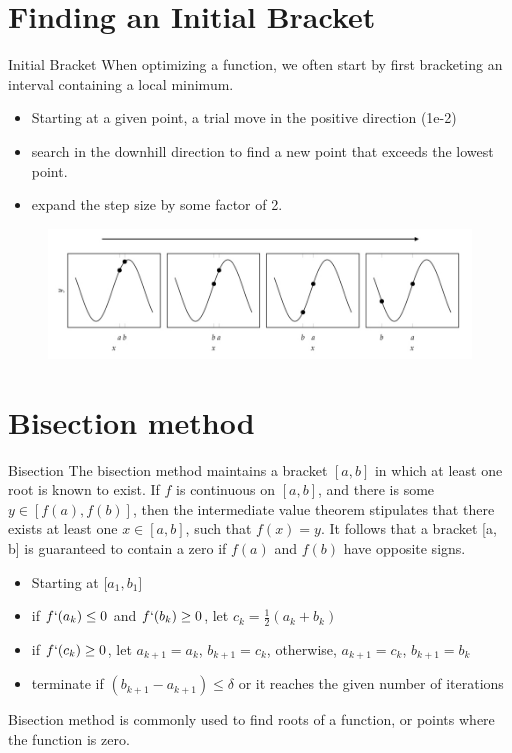 \documentclass{beamer}
\begin{document}
\section{Finding an Initial Bracket}
\begin{frame}{Initial Bracket}
When optimizing a function, we often start by first bracketing an interval containing a local minimum.
\begin{itemize}
    \item Starting at a given point, a trial move in the positive direction (1e-2) 
    \item search in the downhill direction to find a new point that exceeds the lowest point. 
    \item expand the step size by some factor of 2. 
\end{itemize}
\begin{figure}
\centering
\includegraphics[width=120mm]{Figs/bracket.jpeg}
\end{figure}

\end{frame}


\section{Bisection method}
\begin{frame}{Bisection}
The bisection method maintains a bracket $[a, b]$ in which at least one root is known to exist. If $f$ is continuous on $[a, b]$, and there is some $y \in [ f (a), f (b)]$, then the intermediate value theorem stipulates that there exists at least one $x \in [a, b]$, such that $f(x) = y$. It follows that a bracket [a, b] is guaranteed to contain a zero if $f(a)$ and $f(b)$ have opposite signs.

\begin{itemize}
    \item Starting at [$a_1, b_1]$ 
    \item if $f`(a_k) \leq 0$ and $f`(b_k) \geq 0$, let $c_k = \frac{1}{2} (a_k + b_k)$
    \item if $f`(c_k) \geq 0$, let $a_{k+1} = a_k$, $b_{k+1}=c_k$, otherwise, $a_{k+1}=c_k$, $b_{k+1}=b_k$ 
    \item terminate if $(b_{k+1} - a_{k+1}) \leq \delta $ or it reaches the given number of iterations
\end{itemize}

Bisection method is commonly used to find roots of a function, or points where the function is zero.
\end{frame}
\end{document}
